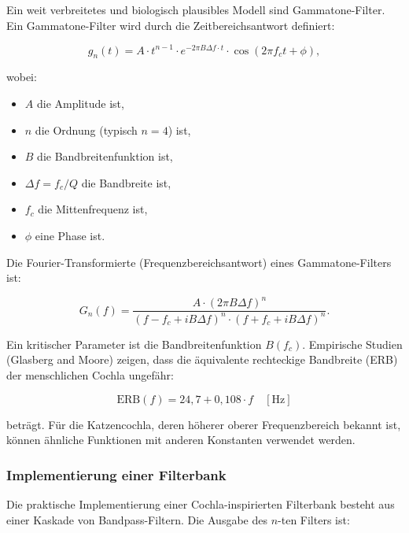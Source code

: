 ﻿\documentclass[12pt, a4paper]{article}
\theoremstyle{definition}
\theoremstyle{remark}
\begin{document}
Ein weit verbreitetes und biologisch plausibles Modell sind Gammatone-Filter. 
Ein Gammatone-Filter wird durch die Zeitbereichsantwort definiert:

\begin{equation}
\label{eq:gammatone_time_domain}
g_n(t) = A \cdot t^{n-1} \cdot e^{-2\pi B \Delta f \cdot t} \cdot \cos(2\pi f_c t + \phi),
\end{equation}

wobei:
\begin{itemize}
\item $A$ die Amplitude ist,
\item $n$ die Ordnung (typisch $n=4$) ist,
\item $B$ die Bandbreitenfunktion ist,
\item $\Delta f = f_c / Q$ die Bandbreite ist,
\item $f_c$ die Mittenfrequenz ist,
\item $\phi$ eine Phase ist.
\end{itemize}

Die Fourier-Transformierte (Frequenzbereichsantwort) eines Gammatone-Filters ist:

\begin{equation}
\label{eq:gammatone_frequency_domain}
G_n(f) = \frac{A \cdot (2\pi B \Delta f)^n}{(f - f_c + i B \Delta f)^n 
\cdot (f + f_c + i B \Delta f)^n}.
\end{equation}

Ein kritischer Parameter ist die Bandbreitenfunktion $B(f_c)$. Empirische Studien 
(Glasberg and Moore) zeigen, dass die äquivalente rechteckige Bandbreite (ERB) 
der menschlichen Cochla ungefähr:

\begin{equation}
\label{eq:erb_human}
\mathrm{ERB}(f) = 24{,}7 + 0{,}108 \cdot f \quad [\text{Hz}]
\end{equation}

beträgt. Für die Katzencochla, deren höherer oberer Frequenzbereich bekannt ist, 
können ähnliche Funktionen mit anderen Konstanten verwendet werden.

\subsubsection{Implementierung einer Filterbank}

Die praktische Implementierung einer Cochla-inspirierten Filterbank besteht aus 
einer Kaskade von Bandpass-Filtern. Die Ausgabe des $n$-ten Filters ist:
\end{document}
